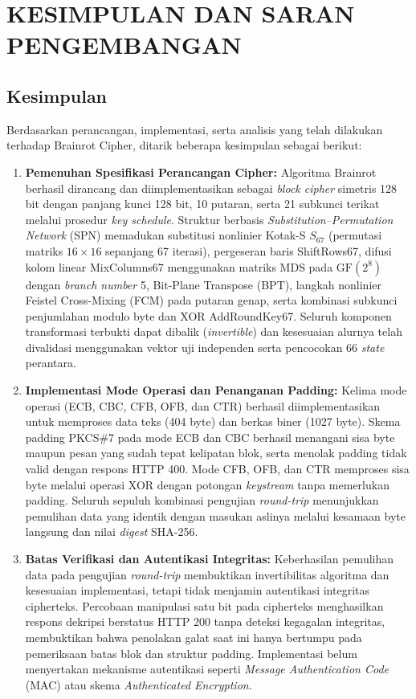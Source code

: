 \chapter{KESIMPULAN DAN SARAN PENGEMBANGAN}

\section{Kesimpulan}
Berdasarkan perancangan, implementasi, serta analisis yang telah dilakukan terhadap Brainrot Cipher, ditarik beberapa kesimpulan sebagai berikut:
\begin{enumerate}
  \item \textbf{Pemenuhan Spesifikasi Perancangan Cipher:} Algoritma Brainrot berhasil dirancang dan diimplementasikan sebagai \textit{block cipher} simetris 128 bit dengan panjang kunci 128 bit, 10 putaran, serta 21 subkunci terikat melalui prosedur \textit{key schedule}. Struktur berbasis \textit{Substitution--Permutation Network} (SPN) memadukan substitusi nonlinier Kotak-S $S_{67}$ (permutasi matriks $16\times16$ sepanjang 67 iterasi), pergeseran baris ShiftRows67, difusi kolom linear MixColumns67 menggunakan matriks MDS pada $\mathrm{GF}(2^8)$ dengan \textit{branch number} 5, Bit-Plane Transpose (BPT), langkah nonlinier Feistel Cross-Mixing (FCM) pada putaran genap, serta kombinasi subkunci penjumlahan modulo byte dan XOR AddRoundKey67. Seluruh komponen transformasi terbukti dapat dibalik (\textit{invertible}) dan kesesuaian alurnya telah divalidasi menggunakan vektor uji independen serta pencocokan 66 \textit{state} perantara.

  \item \textbf{Implementasi Mode Operasi dan Penanganan Padding:} Kelima mode operasi (ECB, CBC, CFB, OFB, dan CTR) berhasil diimplementasikan untuk memproses data teks (404 byte) dan berkas biner (1027 byte). Skema padding PKCS\#7 pada mode ECB dan CBC berhasil menangani sisa byte maupun pesan yang sudah tepat kelipatan blok, serta menolak padding tidak valid dengan respons HTTP 400. Mode CFB, OFB, dan CTR memproses sisa byte melalui operasi XOR dengan potongan \textit{keystream} tanpa memerlukan padding. Seluruh sepuluh kombinasi pengujian \textit{round-trip} menunjukkan pemulihan data yang identik dengan masukan aslinya melalui kesamaan byte langsung dan nilai \textit{digest} SHA-256.

  \item \textbf{Batas Verifikasi dan Autentikasi Integritas:} Keberhasilan pemulihan data pada pengujian \textit{round-trip} membuktikan invertibilitas algoritma dan kesesuaian implementasi, tetapi tidak menjamin autentikasi integritas cipherteks. Percobaan manipulasi satu bit pada cipherteks menghasilkan respons dekripsi berstatus HTTP 200 tanpa deteksi kegagalan integritas, membuktikan bahwa penolakan galat saat ini hanya bertumpu pada pemeriksaan batas blok dan struktur padding. Implementasi belum menyertakan mekanisme autentikasi seperti \textit{Message Authentication Code} (MAC) atau skema \textit{Authenticated Encryption}.


\end{enumerate}

